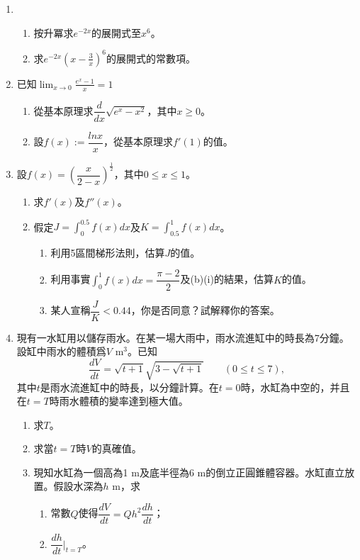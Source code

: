 \documentclass[12pt]{article}
\begin{document}
    \begin{enumerate}
        \item \begin{enumerate}
            \item 按升冪求$e^{-2x}$的展開式至$x^6$。
            \item 求$e^{-2x}(x-\frac{3}{x})^{6}$的展開式的常數項。
        \end{enumerate}
        \item 已知$\displaystyle \lim_{x\to 0}\frac{e^x-1}{x}=1$\begin{enumerate}
            \item 從基本原理求$\dfrac{d}{dx}\sqrt{e^x-x^2}$，其中$x\geq 0$。
            \item 設$f(x):=\dfrac{ln{x}}{x}$，從基本原理求$f'(1)$的值。
        \end{enumerate}
        \item 設$f(x)=(\dfrac{x}{2-x})^{\frac{1}{2}}$，其中$0\leq x\leq 1$。\begin{enumerate}
            \item 求$f'(x)$及$f''(x)$。
            \item 假定$J=\displaystyle\int_0^{0.5}f(x)dx$及$K=\displaystyle\int_{0.5}^1 f(x)dx$。\begin{enumerate}
                \item 利用5區間梯形法則，估算$J$的值。
                \item 利用事實$\displaystyle\int_0^1 f(x)dx=\dfrac{\pi-2}{2}$及(b)(i)的結果，估算$K$的值。
                \item 某人宣稱$\dfrac{J}{K}<0.44$，你是否同意？試解釋你的答案。
            \end{enumerate}
        \end{enumerate}
        \item 現有一水缸用以儲存雨水。在某一場大雨中，雨水流進缸中的時長為7分鐘。設缸中雨水的體積爲$V$ m$^3$。已知$$\frac{dV}{dt}=\sqrt{t+1}\sqrt{3-\sqrt{t+1}} \quad \quad (0\leq t\leq 7),$$其中$t$是雨水流進缸中的時長，以分鐘計算。在$t=0$時，水缸為中空的，并且在$t=T$時雨水體積的變率達到極大值。\begin{enumerate}
            \item 求$T$。
            \item 求當$t=T$時$V$的真確值。
            \item 現知水缸為一個高為1 m及底半徑為6 m的倒立正圓錐體容器。水缸直立放置。假設水深為$h$ m，求\begin{enumerate}
                \item 常數$Q$使得$\dfrac{dV}{dt}=Qh^2\dfrac{dh}{dt}$；
                \item $\dfrac{dh}{dt}\bigg|_{t=T}$。
            \end{enumerate}
        \end{enumerate}
    \end{enumerate}
\end{document}
